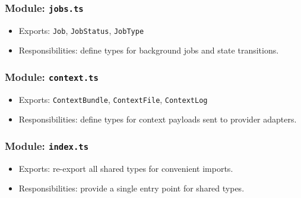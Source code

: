 \documentclass[11pt]{article}
\begin{document}
\subsubsection*{Module: \texttt{jobs.ts}}
\begin{itemize}[noitemsep]
  \item Exports: \texttt{Job}, \texttt{JobStatus}, \texttt{JobType}
  \item Responsibilities: define types for background jobs and state transitions.
\end{itemize}

\subsubsection*{Module: \texttt{context.ts}}
\begin{itemize}[noitemsep]
  \item Exports: \texttt{ContextBundle}, \texttt{ContextFile}, \texttt{ContextLog}
  \item Responsibilities: define types for context payloads sent to provider adapters.
\end{itemize}

\subsubsection*{Module: \texttt{index.ts}}
\begin{itemize}[noitemsep]
  \item Exports: re-export all shared types for convenient imports.
  \item Responsibilities: provide a single entry point for shared types.
\end{itemize}
\end{document}
